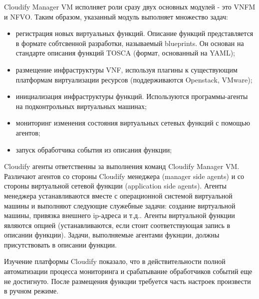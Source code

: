 \documentclass[oneside,final,14pt,a4paper]{extreport}
\begin{document}
Cloudify Manager VM исполняет роли сразу двух основных модулей - это VNFM и NFVO. Таким образом, указанный модуль выполняет множество задач:
\begin{itemize}
	\item регистрация новых виртуальных функций. Описание функций представляется в формате собтсвенной разработки, называемый blueprints. Он основан на стандарте описания функций TOSCA (формат, основанный на YAML);
	\item размещение инфраструктуры VNF, используя плагины к существующим платформам виртуализации ресурсов (поддерживаются Openstack, VMware);
	\item инициализация инфраструктуры функций. Используются программы-агенты на подконтрольных виртуальных машинах;
	\item мониторинг изменения состояния виртуальных сетевых функций с помощью агентов;
	\item запуск обработчика события из описания функции;
\end{itemize}

Cloudify агенты ответственны за выполнения команд Cloudify Manager VM. Различают агентов со стороны Cloudify менеджера (manager side agents) и со стороны виртуальной сетевой функции (application side agents). Агенты менеджера устанавливаются вместе с операционной системой виртуальной машины и выполняют следующие служебные задачи: создание виртуальной машины, привязка внешнего ip-адреса и т.д.. Агенты виртуальной функции являются опцией (устанавливаются, если стоит соответствующая запись в описании функции). Задачи, выполняемые агентами фукнции, должны присутствовать в описании функции.\cite{cloudify-official-oveview1}

Изучение платформы Cloudify показало, что в действительности полной автоматизации процесса мониторинга и срабатывание обработчиков событий еще не достигнуто. После размещения функции требуется часть настроек произвести в ручном режиме. 
\end{document}
